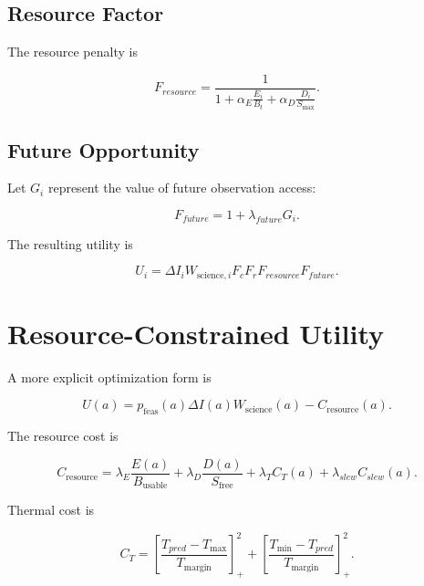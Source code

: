 \documentclass[11pt,a4paper]{article}
\begin{document}
\subsection{Resource Factor}

The resource penalty is

\begin{equation}
F_{resource}
=
\frac{1}{
1+
\alpha_E
\frac{E_i}{B_t}
+
\alpha_D
\frac{D_i}{S_{\max}}
}.
\end{equation}

\subsection{Future Opportunity}

Let $G_i$ represent the value of future observation access:

\begin{equation}
F_{future}
=
1+\lambda_{future}G_i.
\end{equation}

The resulting utility is

\begin{equation}
\boxed{
U_i
=
\Delta I_i
W_{\mathrm{science},i}
F_c
F_r
F_{resource}
F_{future}.
}
\end{equation}


\section{Resource-Constrained Utility}

A more explicit optimization form is

\begin{equation}
U(a)
=
p_{\mathrm{feas}}(a)
\Delta I(a)
W_{\mathrm{science}}(a)
-
C_{\mathrm{resource}}(a).
\end{equation}

The resource cost is

\begin{equation}
C_{\mathrm{resource}}
=
\lambda_E
\frac{E(a)}{B_{\mathrm{usable}}}
+
\lambda_D
\frac{D(a)}{S_{\mathrm{free}}}
+
\lambda_TC_T(a)
+
\lambda_{slew}C_{slew}(a).
\end{equation}

Thermal cost is

\begin{equation}
C_T
=
\left[
\frac{
T_{pred}-T_{\max}
}{
T_{\mathrm{margin}}
}
\right]_+^2
+
\left[
\frac{
T_{\min}-T_{pred}
}{
T_{\mathrm{margin}}
}
\right]_+^2.
\end{equation}
\end{document}
